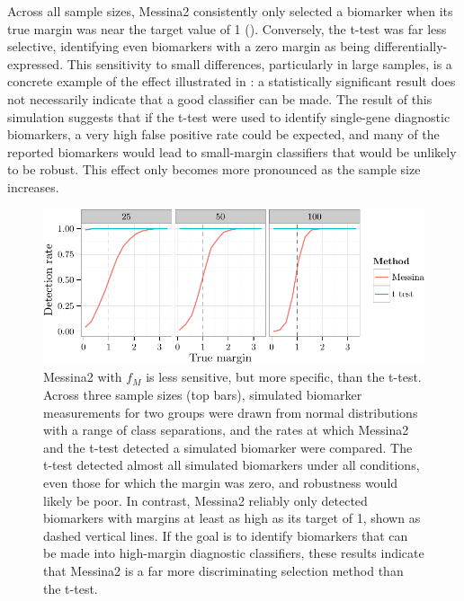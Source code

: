 \documentclass[dissertation.tex]{subfiles}
\begin{document}
Across all sample sizes, Messina2 consistently only selected a biomarker when its true margin was near the target value of 1 ().  Conversely, the t-test was far less selective, identifying even biomarkers with a zero margin as being differentially-expressed.  This sensitivity to small differences, particularly in large samples, is a concrete example of the effect illustrated in : a statistically significant result does not necessarily indicate that a good classifier can be made.  The result of this simulation suggests that if the t-test were used to identify single-gene diagnostic biomarkers, a very high false positive rate could be expected, and many of the reported biomarkers would lead to small-margin classifiers that would be unlikely to be robust.  This effect only becomes more pronounced as the sample size increases.

\begin{figure}[!htbp]
\centering
\includegraphics[width=\linewidth]{analysis/messina/figure/06-E2A-E2A-plots-1}
\caption[Messina2 $f_M$ selects only desired biomarkers]{Messina2 with $f_M$ is less sensitive, but more specific, than the t-test.  Across three sample sizes (top bars), simulated biomarker measurements for two groups were drawn from normal distributions with a range of class separations, and the rates at which Messina2 and the t-test detected a simulated biomarker were compared.  The t-test detected almost all simulated biomarkers under all conditions, even those for which the margin was zero, and robustness would likely be poor.  In contrast, Messina2 reliably only detected biomarkers with margins at least as high as its target of 1, shown as dashed vertical lines.  If the goal is to identify biomarkers that can be made into high-margin diagnostic classifiers, these results indicate that Messina2 is a far more discriminating selection method than the t-test.}\label{fig:mess-vs-t}
\end{figure}
\end{document}
